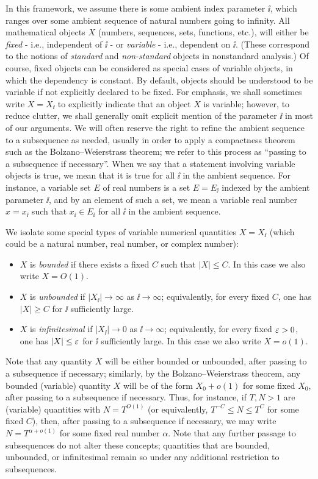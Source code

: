 In this framework, we assume there is some ambient index parameter $\ii$, which ranges over some ambient sequence of natural numbers going to infinity.  All mathematical objects $X$ (numbers, sequences, sets, functions, etc.), will either be \emph{fixed} - i.e., independent of $\ii$ - or \emph{variable} - i.e., dependent on $\ii$.  (These correspond to the notions of \emph{standard} and \emph{non-standard} objects in nonstandard analysis.)  Of course, fixed objects can be considered as special cases of variable objects, in which the dependency is constant.  By default, objects should be understood to be variable if not explicitly declared to be fixed. For emphasis, we shall sometimes write $X = X_{\ii}$ to explicitly indicate that an object $X$ is variable; however, to reduce clutter, we shall generally omit explicit mention of the parameter $\ii$ in most of our arguments. We will often reserve the right to refine the ambient sequence to a subsequence as needed, usually in order to apply a compactness theorem such as the Bolzano--Weierstrass theorem; we refer to this process as ``passing to a subsequence if necessary''.  When we say that a statement involving variable objects is true, we mean that it is true for all $\ii$ in the ambient sequence.
For instance, a variable set $E$ of real numbers is a set $E = E_{\ii}$ indexed by the ambient parameter $\ii$, and by an element of such a set, we mean a variable real number $x = x_{\ii}$ such that $x_{\ii} \in E_{\ii}$ for all $\ii$ in the ambient sequence.

We isolate some special types of variable numerical quantities $X = X_{\ii}$ (which could be a natural number, real number, or complex number):
\begin{itemize}
\item $X$ is \emph{bounded} if there exists a fixed $C$ such that $|X| \leq C$. In this case we also write $X = O(1)$.
\item $X$ is \emph{unbounded} if $|X_{\ii}| \to \infty$ as $\ii \to \infty$; equivalently, for every fixed $C$, one has $|X| \geq C$ for $\ii$ sufficiently large.
\item $X$ is \emph{infinitesimal} if $|X_{\ii}| \to 0$ as $\ii \to \infty$; equivalently, for every fixed $\varepsilon>0$, one has $|X| \leq \varepsilon$ for $\ii$ sufficiently large. In this case we also write $X = o(1)$.
\end{itemize}

Note that any quantity $X$ will be either bounded or unbounded, after passing to a subsequence if necessary; similarly, by the Bolzano--Weierstrass theorem, any bounded (variable) quantity $X$ will be of the form $X_0+o(1)$ for some fixed $X_0$, after passing to a subsequence if necessary.  Thus, for instance, if $T, N > 1$ are (variable) quantities with $N = T^{O(1)}$ (or equivalently, $T^{-C} \leq N \leq T^C$ for some fixed $C$), then, after passing to a subsequence if necessary, we may write $N = T^{\alpha+o(1)}$ for some fixed real number $\alpha$.  Note that any further passage to subsequences do not alter these concepts; quantities that are bounded, unbounded, or infinitesimal remain so under any additional restriction to subsequences.

